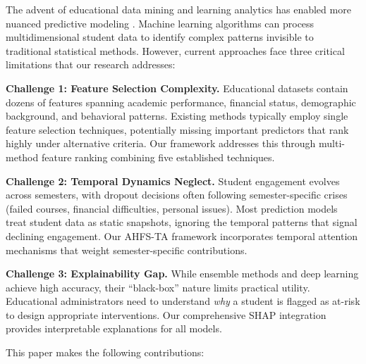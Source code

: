 \documentclass[journal]{IEEEtran}
\begin{document}
The advent of educational data mining and learning analytics has enabled more nuanced predictive modeling \cite{romero2020educational}. Machine learning algorithms can process multidimensional student data to identify complex patterns invisible to traditional statistical methods. However, current approaches face three critical limitations that our research addresses:

\textbf{Challenge 1: Feature Selection Complexity.} Educational datasets contain dozens of features spanning academic performance, financial status, demographic background, and behavioral patterns. Existing methods typically employ single feature selection techniques, potentially missing important predictors that rank highly under alternative criteria. Our framework addresses this through multi-method feature ranking combining five established techniques.

\textbf{Challenge 2: Temporal Dynamics Neglect.} Student engagement evolves across semesters, with dropout decisions often following semester-specific crises (failed courses, financial difficulties, personal issues). Most prediction models treat student data as static snapshots, ignoring the temporal patterns that signal declining engagement. Our AHFS-TA framework incorporates temporal attention mechanisms that weight semester-specific contributions.

\textbf{Challenge 3: Explainability Gap.} While ensemble methods and deep learning achieve high accuracy, their ``black-box'' nature limits practical utility. Educational administrators need to understand \textit{why} a student is flagged as at-risk to design appropriate interventions. Our comprehensive SHAP integration provides interpretable explanations for all models.

This paper makes the following contributions:
\end{document}
